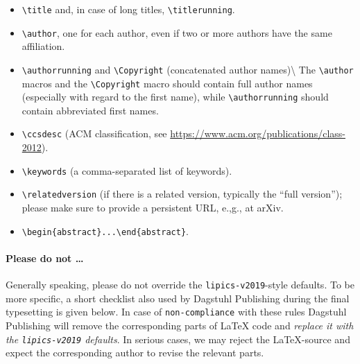 \documentclass[a4paper ,UKenglish  ,cleveref ,autoref ,thm-restate   ]{lipics-v2019}
\def\tightlist{}
\begin{document}
\begin{itemize}
\tightlist
\item
  \texttt{\textbackslash{}title} and, in case of long titles,
  \texttt{\textbackslash{}titlerunning}.
\item
  \texttt{\textbackslash{}author}, one for each author, even if two or
  more authors have the same affiliation.
\item
  \texttt{\textbackslash{}authorrunning} and
  \texttt{\textbackslash{}Copyright} (concatenated author
  names)\textbackslash{} The \texttt{\textbackslash{}author} macros and
  the \texttt{\textbackslash{}Copyright} macro should contain full
  author names (especially with regard to the first name), while
  \texttt{\textbackslash{}authorrunning} should contain abbreviated
  first names.
\item
  \texttt{\textbackslash{}ccsdesc} (ACM classification, see
  \url{https://www.acm.org/publications/class-2012}).
\item
  \texttt{\textbackslash{}keywords} (a comma-separated list of
  keywords).
\item
  \texttt{\textbackslash{}relatedversion} (if there is a related
  version, typically the ``full version''); please make sure to provide
  a persistent URL, e.,g., at arXiv.
\item
  \texttt{\textbackslash{}begin\{abstract\}...\textbackslash{}end\{abstract\}}.
\end{itemize}

\paragraph{\texorpdfstring{Please do not \ldots }{Please do not }}

Generally speaking, please do not override the
\texttt{lipics-v2019}-style defaults. To be more specific, a short
checklist also used by Dagstuhl Publishing during the final typesetting
is given below. In case of \texttt{non-compliance} with these rules
Dagstuhl Publishing will remove the corresponding parts of \LaTeX{} code
and \emph{replace it with the \texttt{lipics-v2019} defaults}. In
serious cases, we may reject the LaTeX-source and expect the
corresponding author to revise the relevant parts.
\end{document}
